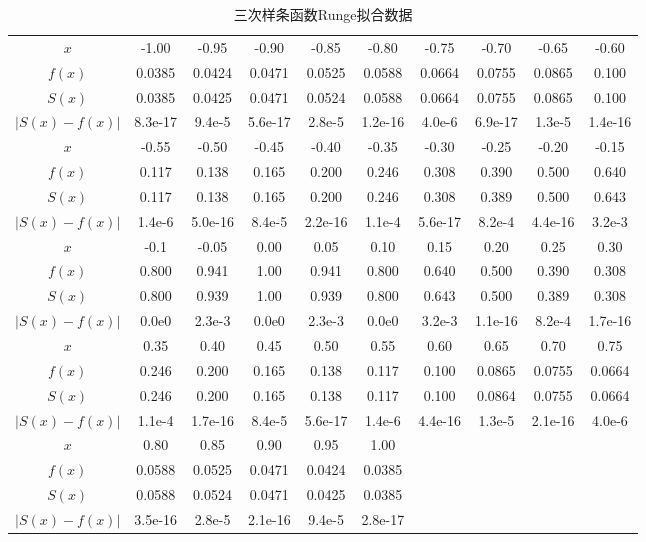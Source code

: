 \documentclass[UTF8]{ctexart}
\begin{document}
\begin{table}[H]
    \caption{三次样条函数Runge拟合数据}
    \begin{tabular}{|c|ccccccccc|}
        \hline
        $x$ & -1.00 & -0.95 & -0.90 & -0.85 & -0.80 & -0.75 & -0.70 & -0.65 & -0.60 \\
        $f(x)$ & 0.0385 & 0.0424 & 0.0471 & 0.0525 & 0.0588 & 0.0664 & 0.0755 & 0.0865 & 0.100 \\
        $S(x)$ & 0.0385 & 0.0425 & 0.0471 & 0.0524 & 0.0588 & 0.0664 & 0.0755 & 0.0865 & 0.100 \\
        $|S(x)-f(x)|$ & 8.3e-17 & 9.4e-5 & 5.6e-17 & 2.8e-5 & 1.2e-16 & 4.0e-6 & 6.9e-17 & 1.3e-5 & 1.4e-16 \\
        \hline
        $x$ & -0.55 & -0.50 & -0.45 & -0.40 & -0.35 & -0.30 & -0.25 & -0.20 & -0.15 \\
        $f(x)$ & 0.117 & 0.138 & 0.165 & 0.200 & 0.246 & 0.308 & 0.390 & 0.500 & 0.640 \\
        $S(x)$ & 0.117 & 0.138 & 0.165 & 0.200 & 0.246 & 0.308 & 0.389 & 0.500 & 0.643 \\
        $|S(x)-f(x)|$ & 1.4e-6 & 5.0e-16 & 8.4e-5 & 2.2e-16 & 1.1e-4 & 5.6e-17 & 8.2e-4 & 4.4e-16 & 3.2e-3 \\
        \hline
        $x$ & -0.1 & -0.05 &  0.00 & 0.05 & 0.10 & 0.15 & 0.20 & 0.25 & 0.30 \\
        $f(x)$ & 0.800 & 0.941 & 1.00 & 0.941 & 0.800 & 0.640 & 0.500 & 0.390 & 0.308 \\
        $S(x)$ & 0.800 & 0.939 & 1.00 & 0.939 & 0.800 & 0.643 & 0.500 & 0.389 & 0.308 \\
        $|S(x)-f(x)|$ & 0.0e0 & 2.3e-3 & 0.0e0 & 2.3e-3 & 0.0e0 & 3.2e-3 & 1.1e-16 & 8.2e-4 & 1.7e-16 \\
        \hline
        $x$ & 0.35 & 0.40 & 0.45 & 0.50 & 0.55 & 0.60 & 0.65 & 0.70 & 0.75 \\
        $f(x)$ & 0.246 & 0.200 & 0.165 & 0.138 & 0.117 & 0.100 & 0.0865 & 0.0755 & 0.0664 \\
        $S(x)$ & 0.246 & 0.200 & 0.165 & 0.138 & 0.117 & 0.100 & 0.0864 & 0.0755 & 0.0664\\
        $|S(x)-f(x)|$ & 1.1e-4 & 1.7e-16 & 8.4e-5 & 5.6e-17 & 1.4e-6 & 4.4e-16 & 1.3e-5 & 2.1e-16 & 4.0e-6 \\
        \hline
        $x$ & 0.80 & 0.85 & 0.90 & 0.95 & 1.00 & ~ & ~ & ~ & ~ \\
        $f(x)$ & 0.0588 & 0.0525 & 0.0471 & 0.0424 & 0.0385 & ~ & ~ & ~ & ~\\
        $S(x)$ & 0.0588 & 0.0524 & 0.0471 & 0.0425 & 0.0385 & ~ & ~ & ~ & ~\\
        $|S(x)-f(x)|$ & 3.5e-16 & 2.8e-5 & 2.1e-16 & 9.4e-5 & 2.8e-17 & ~ & ~ & ~ & ~ \\
        \hline
    \end{tabular}
\end{table}
\end{document}
